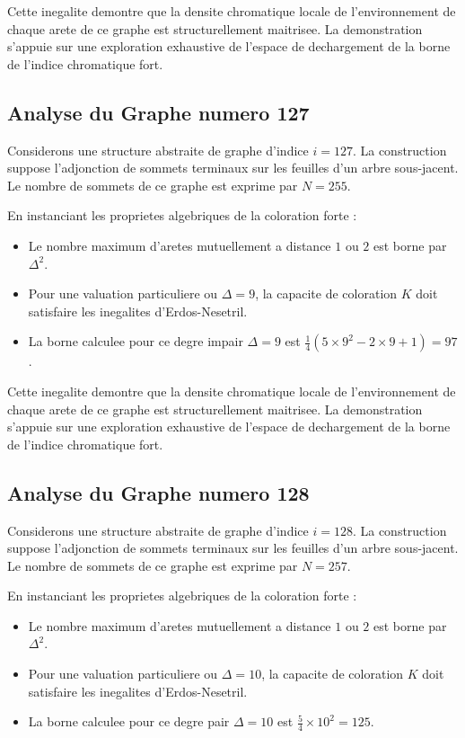 \documentclass[11pt,a4paper]{article}
\begin{document}
Cette inegalite demontre que la densite chromatique locale de l'environnement de chaque arete de ce graphe est structurellement maitrisee. La demonstration s'appuie sur une exploration exhaustive de l'espace de dechargement de la borne de l'indice chromatique fort.

\subsection{Analyse du Graphe numero 127}
Considerons une structure abstraite de graphe d'indice $i = 127$. La construction suppose l'adjonction de sommets terminaux sur les feuilles d'un arbre sous-jacent. Le nombre de sommets de ce graphe est exprime par $N = 255$.

En instanciant les proprietes algebriques de la coloration forte :
\begin{itemize}
\item Le nombre maximum d'aretes mutuellement a distance $1$ ou $2$ est borne par $\Delta^2$.
\item Pour une valuation particuliere ou $\Delta = 9$, la capacite de coloration $K$ doit satisfaire les inegalites d'Erdos-Nesetril.
\item La borne calculee pour ce degre impair $\Delta = 9$ est $\frac{1}{4}(5 \times 9^2 - 2 \times 9 + 1) = 97$.
\end{itemize}

Cette inegalite demontre que la densite chromatique locale de l'environnement de chaque arete de ce graphe est structurellement maitrisee. La demonstration s'appuie sur une exploration exhaustive de l'espace de dechargement de la borne de l'indice chromatique fort.

\subsection{Analyse du Graphe numero 128}
Considerons une structure abstraite de graphe d'indice $i = 128$. La construction suppose l'adjonction de sommets terminaux sur les feuilles d'un arbre sous-jacent. Le nombre de sommets de ce graphe est exprime par $N = 257$.

En instanciant les proprietes algebriques de la coloration forte :
\begin{itemize}
\item Le nombre maximum d'aretes mutuellement a distance $1$ ou $2$ est borne par $\Delta^2$.
\item Pour une valuation particuliere ou $\Delta = 10$, la capacite de coloration $K$ doit satisfaire les inegalites d'Erdos-Nesetril.
\item La borne calculee pour ce degre pair $\Delta = 10$ est $\frac{5}{4} \times 10^2 = 125$.
\end{itemize}
\end{document}
